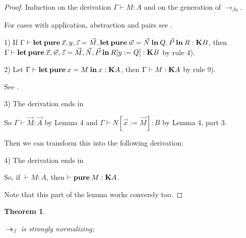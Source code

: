 \documentclass[a4paper]{article}
\newtheorem{theorem}{Theorem}
\begin{document}
\begin{proof}

Induction on the derivation $\Gamma \vdash M : A$ and on the generation of $\rightarrow_{\beta \eta}$.

For cases with application, abstraction and pairs see \cite{Morten} \cite{Pierce}.

1) If $\Gamma \vdash {\bf let \: pure \:} \vec{x}, y, \vec{z} = \vec{M}, {\bf let \: pure \: } \vec{w} = \vec{N} {\bf \: in \: } Q, \vec{P}  {\: \bf in \:} R : {\bf K}B$,
  then $\Gamma \vdash {\bf let \: pure \:} \vec{x}, \vec{w}, \vec{z} = \vec{M}, \vec{N}, \vec{P} \: { \bf in } \: R [y := Q] : {\bf K}B$ by rule 4).

2) Let $\Gamma \vdash {\bf let \: pure \:} x = M {\: \bf in \: } x : {\bf K}A$, then $\Gamma \vdash M : {\bf K}A$ by rule 9).

See \cite{ModalK}.

3) The derivation ends in

\begin{prooftree}
\end{prooftree}

So $\Gamma \vdash \vec{M} : \vec{A}$ by Lemma 4 and $\Gamma \vdash N [\vec{x} := \vec{M}] : B$ by Lemma 4, part 3.

Then we can transform this into the following derivation:

\begin{prooftree}
\end{prooftree}

4) The derivation ends in

\begin{prooftree}
\end{prooftree}

So, if $\vdash M : A$, then $\vdash {\bf pure \:} M : {\bf K}A$.

Note that this part of the lemma works conversly too.
\end{proof}

\begin{theorem}
  $ $

  $\twoheadrightarrow_{\beta}$ is strongly normalizing;
\end{theorem}
\end{document}
